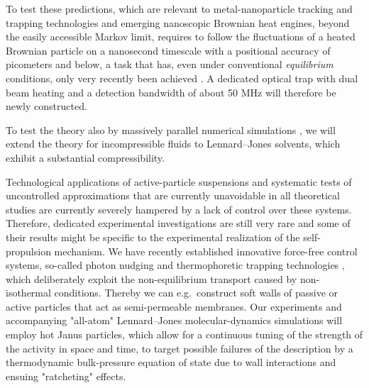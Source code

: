 \begin{workpackage}
\begin{tasklist}
\begin{task}[title=Noise Temperature,id=task3,lead=Leipzig,wphases=0-24!0.5]
To test these predictions, which are relevant to metal-nanoparticle tracking and trapping technologies and emerging
nanoscopic Brownian heat engines, beyond the easily accessible Markov limit, requires to follow the fluctuations of 
a heated Brownian particle on a nanosecond timescale with a positional accuracy of picometers and below, a task 
that has, even under conventional \emph{equilibrium} conditions, only very recently been achieved \cite{kheifets-etal:2014}.
%
A dedicated optical trap with dual beam heating and a detection bandwidth of about 50 MHz
will therefore be newly constructed.

To test the theory also by massively parallel numerical simulations \cite{chakraborty-etal:2011}, 
we will extend the theory for incompressible fluids 
to Lennard--Jones solvents, which exhibit a substantial compressibility.
\end{task}

\begin{task}[title=Active-Particle Suspensions,id=task4,lead=Leipzig,wphases=24-48!0.5]
Technological applications of active-particle suspensions and systematic tests of
uncontrolled approximations that are currently unavoidable in all theoretical studies are
currently severely hampered by a lack of control over these systems.
%
Therefore, dedicated experimental investigations are still very rare and some of their
results might be specific to the experimental realization of the self-propulsion mechanism.
%
We have recently established innovative force-free control systems, so-called photon nudging
and thermophoretic trapping technologies \cite{Qian2013,Braun:NanoLetters:2015}, which deliberately exploit 
the non-equilibrium transport caused by non-isothermal conditions.
%
Thereby we can e.g.\ construct soft walls of passive or active particles that act as
semi-permeable membranes.
%
Our experiments and accompanying "all-atom" Lennard--Jones molecular-dynamics simulations \cite{chakraborty-etal:2011} 
will employ hot Janus particles, which allow for a continuous tuning of the strength of 
the activity in space and time, to target 
possible failures of the description by a thermodynamic bulk-pressure equation of
state \cite{ginot-etal:2015} due to wall interactions and ensuing "ratcheting" effects.
\end{task}


\end{tasklist}


\end{workpackage}
